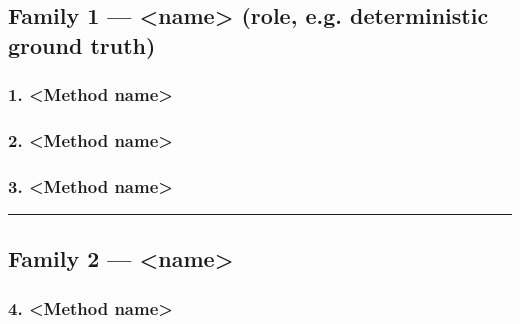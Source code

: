 \documentclass[12pt,a4paper]{article}
\begin{document}
\subsection{Family 1 --- <name> (role, e.g. deterministic ground truth)}
\label{sec:family-1}
%

\subsubsection{\texorpdfstring{1. <Method name>}{1. <Method name>}}
\label{sec:method-1}

\subsubsection{\texorpdfstring{2. <Method name>}{2. <Method name>}}
\label{sec:method-2}

\subsubsection{\texorpdfstring{3. <Method name>}{3. <Method name>}}
\label{sec:method-3}

\noindent\rule{\textwidth}{0.4pt}
\FloatBarrier

\subsection{Family 2 --- <name>}
\label{sec:family-2}
%

\subsubsection{\texorpdfstring{4. <Method name>}{4. <Method name>}}
\label{sec:method-4}
\end{document}

